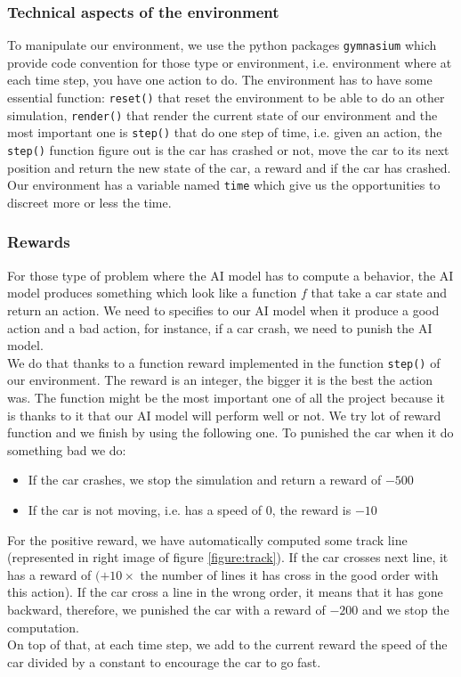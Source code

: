 \documentclass[11pt,a4paper]{article}
\newcounter{fig}
\newcommand{\mlist}[1]{\begin{itemize}[noitemsep,topsep=0pt]#1\end{itemize}}
\begin{document}
			\subsubsection{Technical aspects of the environment}
To manipulate our environment, we use the python packages \texttt{gymnasium} which provide code convention for those type or environment, i.e. environment where at each time step, you have one action to do. The environment has to have some essential function: \texttt{reset()} that reset the environment to be able to do an other simulation, \texttt{render()} that render the current state of our environment and the most important one is \texttt{step()} that do one step of time, i.e. given an action, the \texttt{step()} function figure out is the car has crashed or not, move the car to its next position and return the new state of the car, a reward and if the car has crashed.\\
Our environment has a variable named \texttt{time} which give us the opportunities to discreet more or less the time.
		
			\subsubsection{Rewards}
For those type of problem where the AI model has to compute a behavior, the AI model produces something which look like a function $f$ that take a car state and return an action. We need to specifies to our AI model when it produce a good action and a bad action, for instance, if a car crash, we need to punish the AI model.\\
We do that thanks to a function reward implemented in the function \texttt{step()} of our environment. The reward is an integer, the bigger it is the best the action was. The function might be the most important one of all the project because it is thanks to it that our AI model will perform well or not. We try lot of reward function and we finish by using the following one. To punished the car when it do something bad we do:
\mlist{
\item If the car crashes, we stop the simulation and return a reward of $-500$
\item If the car is not moving, i.e. has a speed of $0$, the reward is $-10$
}
For the positive reward, we have automatically computed some track line (represented in right image of figure \ref{figure:track}). If the car crosses next line, it has a reward of $(+10\times$ the number of lines it has cross in the good order with this action). If the car cross a line in the wrong order, it means that it has gone backward, therefore, we punished the car with a reward of $-200$ and we stop the computation.\\
On top of that, at each time step, we add to the current reward the speed of the car divided by a constant to encourage the car to go fast.
\end{document}
